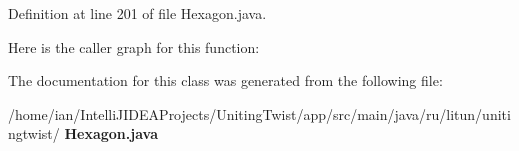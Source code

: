 Definition at line 201 of file Hexagon.\+java.

Here is the caller graph for this function\+:


The documentation for this class was generated from the following file\+:\begin{DoxyCompactItemize}
\item 
/home/ian/\+Intelli\+J\+I\+D\+E\+A\+Projects/\+Uniting\+Twist/app/src/main/java/ru/litun/unitingtwist/\textbf{ Hexagon.\+java}\end{DoxyCompactItemize}
